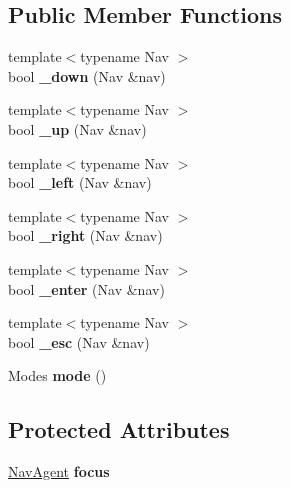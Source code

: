 \subsection*{Public Member Functions}
\begin{DoxyCompactItemize}
\item 
\mbox{\label{classItemNav_a88d3da019727c248ca83b6a5bd1b6ae3}} 
{\footnotesize template$<$typename Nav $>$ }\\bool {\bfseries \+\_\+down} (Nav \&nav)
\item 
\mbox{\label{classItemNav_a97d9b170b12a5e934233fda1c116b34b}} 
{\footnotesize template$<$typename Nav $>$ }\\bool {\bfseries \+\_\+up} (Nav \&nav)
\item 
\mbox{\label{classItemNav_a35fce8f3e0412ec96715e071000e7959}} 
{\footnotesize template$<$typename Nav $>$ }\\bool {\bfseries \+\_\+left} (Nav \&nav)
\item 
\mbox{\label{classItemNav_a4c50b94f9483147cab5a8e732b8475c0}} 
{\footnotesize template$<$typename Nav $>$ }\\bool {\bfseries \+\_\+right} (Nav \&nav)
\item 
\mbox{\label{classItemNav_a73524b209a2442d9921a273ed3718af9}} 
{\footnotesize template$<$typename Nav $>$ }\\bool {\bfseries \+\_\+enter} (Nav \&nav)
\item 
\mbox{\label{classItemNav_a45181d1d1ccbd98500cb2ac060b11ec2}} 
{\footnotesize template$<$typename Nav $>$ }\\bool {\bfseries \+\_\+esc} (Nav \&nav)
\item 
\mbox{\label{classItemNav_ace0c0ead6926f4de5cb6dea3db767267}} 
Modes {\bfseries mode} ()
\end{DoxyCompactItemize}
\subsection*{Protected Attributes}
\begin{DoxyCompactItemize}
\item 
\mbox{\label{classItemNav_a6b58882d926efce27e342fac54fe853a}} 
\hyperlink{structNavAgent}{Nav\+Agent} {\bfseries focus}
\end{DoxyCompactItemize}


